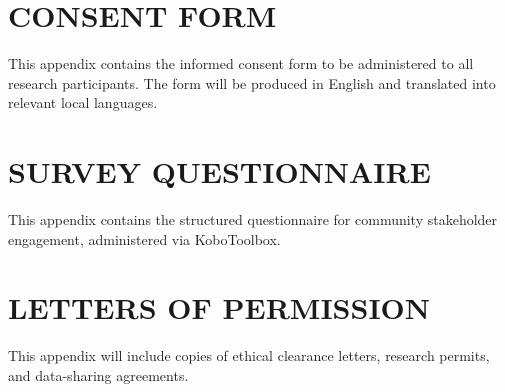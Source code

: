 \documentclass[12pt,a4paper]{report}
\begin{document}







\begin{appendices}
\chapter{CONSENT FORM}
\label{app:consent}
This appendix contains the informed consent form to be administered to all research participants. The form will be produced in English and translated into relevant local languages.

\chapter{SURVEY QUESTIONNAIRE}
\label{app:questionnaire}
This appendix contains the structured questionnaire for community stakeholder engagement, administered via KoboToolbox.

\chapter{LETTERS OF PERMISSION}
\label{app:permissions}
This appendix will include copies of ethical clearance letters, research permits, and data-sharing agreements.

\end{appendices}
\end{document}
